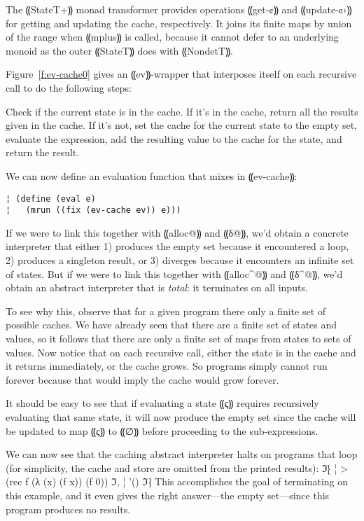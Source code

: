 The ⸨StateT+⸩ monad transformer provides operations
⸨get-¢⸩ and ⸨update-¢›⸩ for getting and updating the
cache, respectively. It joins its finite maps by union of the range
when ⸨mplus⸩ is called, because it cannot defer to an
underlying monoid as the outer ⸨StateT⸩ does with
⸨NondetT⸩.

Figure~\ref{f:ev-cache0} gives an ⸨ev⸩-wrapper that interposes
itself on each recursive call to do the following steps:
\begin{displayquote}
Check if the current state is in the cache.  If it's in the cache, return all
the results given in the cache.  If it's not, set the cache for the current
state to the empty set, evaluate the expression, add the resulting value to the
cache for the state, and return the result.
\end{displayquote}

We can now define an evaluation function that mixes in ⸨ev-cache⸩:
\begin{lstlisting}
¦ (define (eval e)
¦   (mrun ((fix (ev-cache ev)) e)))
\end{lstlisting}

If we were to link this together with ⸨alloc@⸩ and ⸨δ@⸩, we'd obtain a concrete
interpreter that either 1) produces the empty set because it encountered a
loop, 2) produces a singleton result, or 3) diverges because it encounters an
infinite set of states.  But if we were to link this together with ⸨alloc^@⸩
and ⸨δ^@⸩, we'd obtain an abstract interpreter that is \emph{total}: it
terminates on all inputs.

To see why this, observe that for a given program there only a finite set of
possible caches.  We have already seen that there are a finite set of states
and values, so it follows that there are only a finite set of maps from states
to sets of values.  Now notice that on each recursive call, either the state is
in the cache and it returns immediately, or the cache grows.  So programs
simply cannot run forever because that would imply the cache would grow
forever.

It should be easy to see that if evaluating a state ⸨ς⸩ requires recursively
evaluating that same state, it will now produce the empty set since the cache
will be updated to map ⸨ς⸩ to ⸨∅⸩ before proceeding to the sub-expressions.

We can now see that the caching abstract interpreter halts on programs that
loop (for simplicity, the cache and store are omitted from the printed
results):
ℑ⁅
¦ > (rec f (λ (x) (f x)) (f 0))
ℑ,
¦ '()
ℑ⁆
This accomplishes the goal of terminating on this example, and it even
gives the right answer---the empty set---since this program produces
no results.

